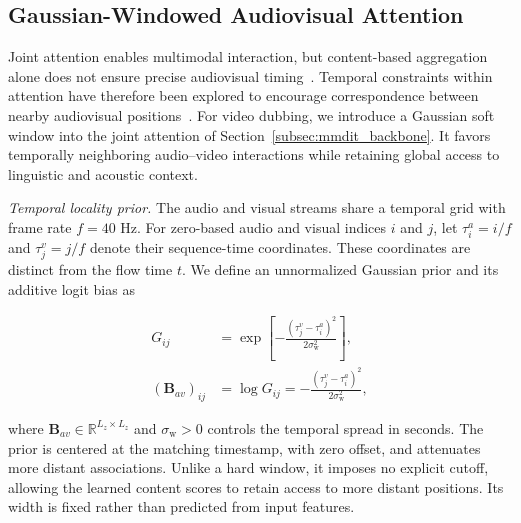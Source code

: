 
\subsection{Gaussian-Windowed Audiovisual Attention}
\label{subsec:gaussian_windowed_attention}
\label{sec:temporal_window}

Joint attention enables multimodal interaction, but content-based aggregation alone does not ensure precise audiovisual timing~\cite{cheng2025mmaudio}. Temporal constraints within attention have therefore been explored to encourage correspondence between nearby audiovisual positions~\cite{tran2026precise}. For video dubbing, we introduce a Gaussian soft window into the joint attention of Section~\ref{subsec:mmdit_backbone}. It favors temporally neighboring audio–video interactions while retaining global access to linguistic and acoustic context.

\textit{Temporal locality prior.} The audio and visual streams share a temporal grid with frame rate \(f=40\) Hz. For zero-based audio and visual indices \(i\) and \(j\), let \(\tau_i^a=i/f\) and \(\tau_j^v=j/f\) denote their sequence-time coordinates. These coordinates are distinct from the flow time \(t\). We define an unnormalized Gaussian prior and its additive logit bias as

\begin{equation}
\begin{aligned}
G_{ij}
&=
\exp\left[
-\frac{(\tau_j^v-\tau_i^a)^2}
{2\sigma_{\mathrm w}^{2}}
\right],\\
(\mathbf B_{av})_{ij}
&=
\log G_{ij}
=
-\frac{(\tau_j^v-\tau_i^a)^2}
{2\sigma_{\mathrm w}^{2}},
\end{aligned}
\label{eq:gaussian_window}
\end{equation}

where \(\mathbf B_{av}\in\mathbb R^{L_z\times L_z}\) and \(\sigma_{\mathrm w}>0\) controls the temporal spread in seconds. The prior is centered at the matching timestamp, with zero offset, and attenuates more distant associations. Unlike a hard window, it imposes no explicit cutoff, allowing the learned content scores to retain access to more distant positions. Its width is fixed rather than predicted from input features.

